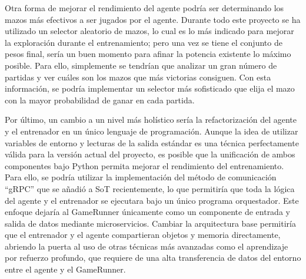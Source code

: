 Otra forma de mejorar el rendimiento del agente podría ser determinando los mazos más efectivos a ser jugados por el agente. Durante todo este proyecto se ha utilizado un selector aleatorio de mazos, lo cual es lo más indicado para mejorar la exploración durante el entrenamiento; pero una vez se tiene el conjunto de pesos final, sería un buen momento para afinar la potencia existente lo máximo posible. Para ello, simplemente se tendrían que analizar un gran número de partidas y ver cuáles son los mazos que más victorias consiguen. Con esta información, se podría implementar un selector más sofisticado que elija el mazo con la mayor probabilidad de ganar en cada partida.

Por último, un cambio a un nivel más holístico sería la refactorización del agente y el entrenador en un único lenguaje de programación. Aunque la idea de utilizar variables de entorno y lecturas de la salida estándar es una técnica perfectamente válida para la versión actual del proyecto, es posible que la unificación de ambos componentes bajo Python permita mejorar el rendimiento del entrenamiento. Para ello, se podría utilizar la implementación del método de comunicación ``gRPC'' que se añadió a SoT recientemente, lo que permitiría que toda la lógica del agente y el entrenador se ejecutara bajo un único programa orquestador. Este enfoque dejaría al GameRunner únicamente como un componente de entrada y salida de datos mediante microservicios. Cambiar la arquitectura base permitiría que el entrenador y el agente compartieran objetos y memoria directamente, abriendo la puerta al uso de otras técnicas más avanzadas como el aprendizaje por refuerzo profundo, que requiere de una alta transferencia de datos del entorno entre el agente y el GameRunner.